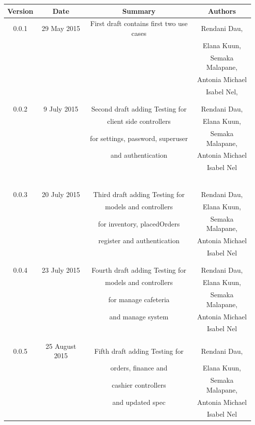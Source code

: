 \documentclass[a4paper,12pt]{report}
\begin{document}
\begin{table}[h!]
\centering
 \begin{tabular}{||c c c c||} 
 \hline
 \textbf{Version} & \textbf{Date} & \textbf{Summary} & \textbf{Authors} \\ [0.5ex] 
 \hline\hline
 0.0.1 & 29 May 2015 &  First draft contains first two use cases  & Rendani Dau, \\ & & & Elana Kuun, \\ & & & Semaka Malapane, \\ & & & Antonia Michael \\ & & & Isabel Nel, \\ & & & \\
 \hline 
 & & & \\
 0.0.2 & 9 July 2015 &  Second draft adding Testing for  & Rendani Dau, \\ & & client side controllers & Elana Kuun, \\ & & for settings, password, superuser & Semaka Malapane, \\ & & and authentication &  Antonia Michael \\ & & & Isabel Nel \\   [1ex] 
\ & & & \\
 \hline 
 & & & \\
 0.0.3 & 20 July 2015 &  Third draft adding Testing for  & Rendani Dau, \\ & & models and controllers & Elana Kuun, \\ & & for inventory, placedOrders & Semaka Malapane, \\ & & register and authentication &  Antonia Michael \\ & & & Isabel Nel \\   [1ex] 
 & & & \\
 \hline 
 & & & \\
 0.0.4 & 23 July 2015 &  Fourth draft adding Testing for  & Rendani Dau, \\ & & models and controllers & Elana Kuun, \\ & & for manage cafeteria & Semaka Malapane, \\ & & and manage system &  Antonia Michael \\ & & & Isabel Nel \\   [1ex] 
& & & \\
 \hline 
 & & & \\
 0.0.5 & 25 August 2015 &  Fifth draft adding Testing for  & Rendani Dau, \\ & & orders, finance and & Elana Kuun, \\ & & cashier controllers& Semaka Malapane, \\ & & and updated spec &  Antonia Michael \\ & & & Isabel Nel \\   [1ex] 

\end{tabular}
\end{table}
\end{document}
